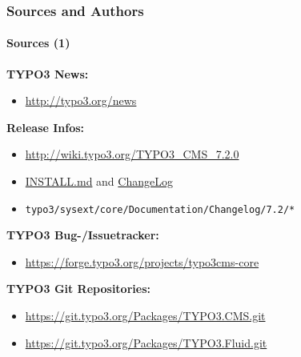 \begin{frame}[fragile]
	\frametitle{Sources and Authors}
	\framesubtitle{Sources (1)}

	\textbf{TYPO3 News:}
		\begin{itemize}\smaller
			\item \url{http://typo3.org/news}
		\end{itemize}

	\textbf{Release Infos:}
		\begin{itemize}\smaller
			\item \url{http://wiki.typo3.org/TYPO3_CMS_7.2.0}
			\item \href{https://github.com/TYPO3/TYPO3.CMS/blob/master/INSTALL.md}{INSTALL.md} and \href{https://github.com/TYPO3/TYPO3.CMS/blob/master/ChangeLog}{ChangeLog}
			\item \texttt{typo3/sysext/core/Documentation/Changelog/7.2/*}
		\end{itemize}

	\textbf{TYPO3 Bug-/Issuetracker:}
		\begin{itemize}\smaller
			\item \url{https://forge.typo3.org/projects/typo3cms-core}
		\end{itemize}

	\textbf{TYPO3 Git Repositories:}
		\begin{itemize}\smaller
			\item \url{https://git.typo3.org/Packages/TYPO3.CMS.git}
			\item \url{https://git.typo3.org/Packages/TYPO3.Fluid.git}
		\end{itemize}

\end{frame}


